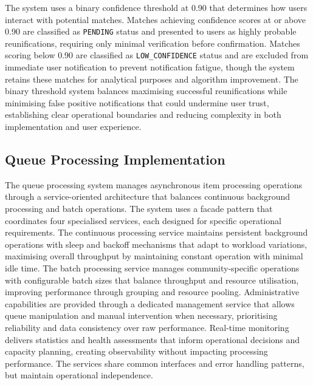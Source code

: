 The system uses a binary confidence threshold at 0.90 that determines how users interact with potential matches. Matches achieving confidence scores at or above 0.90 are classified as \texttt{PENDING} status and presented to users as highly probable reunifications, requiring only minimal verification before confirmation. Matches scoring below 0.90 are classified as \texttt{LOW\_CONFIDENCE} status and are excluded from immediate user notification to prevent notification fatigue, though the system retains these matches for analytical purposes and algorithm improvement. The binary threshold system balances maximising successful reunifications while minimising false positive notifications that could undermine user trust, establishing clear operational boundaries and reducing complexity in both implementation and user experience.



\subsection{Queue Processing Implementation} \label{subsection:queue_processing}

The queue processing system manages asynchronous item processing operations through a service-oriented architecture that balances continuous background processing and batch operations. The system uses a facade pattern that coordinates four specialised services, each designed for specific operational requirements. The continuous processing service maintains persistent background operations with sleep and backoff mechanisms that adapt to workload variations, maximising overall throughput by maintaining constant operation with minimal idle time. The batch processing service manages community-specific operations with configurable batch sizes that balance throughput and resource utilisation, improving performance through grouping and resource pooling. Administrative capabilities are provided through a dedicated management service that allows queue manipulation and manual intervention when necessary, prioritising reliability and data consistency over raw performance. Real-time monitoring delivers statistics and health assessments that inform operational decisions and capacity planning, creating observability without impacting processing performance. The services share common interfaces and error handling patterns, but maintain operational independence.

